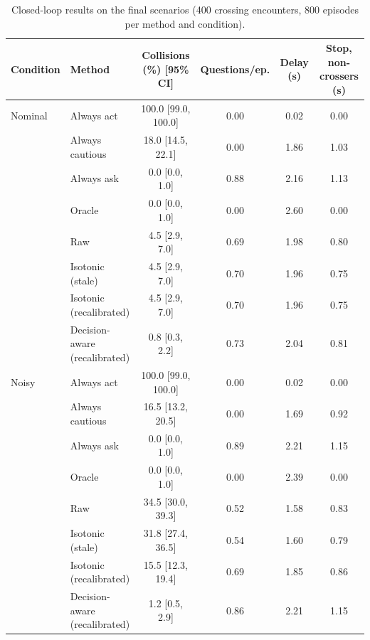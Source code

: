 \begin{table}[t]
\centering
\caption{Closed-loop results on the final scenarios (400 crossing encounters, 800 episodes per method and condition).}
\label{tab:main}
\begin{tabular}{llcccc}
\toprule
Condition & Method & Collisions (\%) [95\% CI] & Questions/ep. & Delay (s) & Stop, non-crossers (s) \\
\midrule
Nominal & Always act & 100.0 [99.0, 100.0] & 0.00 & 0.02 & 0.00 \\
 & Always cautious & 18.0 [14.5, 22.1] & 0.00 & 1.86 & 1.03 \\
 & Always ask & 0.0 [0.0, 1.0] & 0.88 & 2.16 & 1.13 \\
 & Oracle & 0.0 [0.0, 1.0] & 0.00 & 2.60 & 0.00 \\
 & Raw & 4.5 [2.9, 7.0] & 0.69 & 1.98 & 0.80 \\
 & Isotonic (stale) & 4.5 [2.9, 7.0] & 0.70 & 1.96 & 0.75 \\
 & Isotonic (recalibrated) & 4.5 [2.9, 7.0] & 0.70 & 1.96 & 0.75 \\
 & Decision-aware (recalibrated) & 0.8 [0.3, 2.2] & 0.73 & 2.04 & 0.81 \\
\midrule
Noisy & Always act & 100.0 [99.0, 100.0] & 0.00 & 0.02 & 0.00 \\
 & Always cautious & 16.5 [13.2, 20.5] & 0.00 & 1.69 & 0.92 \\
 & Always ask & 0.0 [0.0, 1.0] & 0.89 & 2.21 & 1.15 \\
 & Oracle & 0.0 [0.0, 1.0] & 0.00 & 2.39 & 0.00 \\
 & Raw & 34.5 [30.0, 39.3] & 0.52 & 1.58 & 0.83 \\
 & Isotonic (stale) & 31.8 [27.4, 36.5] & 0.54 & 1.60 & 0.79 \\
 & Isotonic (recalibrated) & 15.5 [12.3, 19.4] & 0.69 & 1.85 & 0.86 \\
 & Decision-aware (recalibrated) & 1.2 [0.5, 2.9] & 0.86 & 2.21 & 1.15 \\
\bottomrule
\end{tabular}
\end{table}
